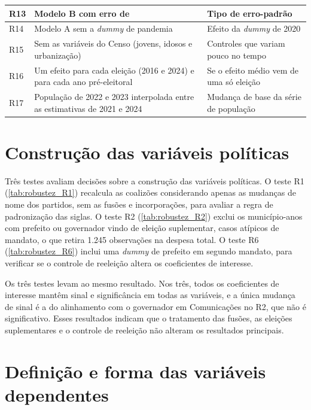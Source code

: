 \begin{quadro}[htbp]
\begin{tabular}{|>{\raggedright\arraybackslash}p{1.0cm}|>{\raggedright\arraybackslash}p{8.0cm}|>{\raggedright\arraybackslash}p{5.0cm}|}
R13 & Modelo B com erro de \textcite{driscoll1998} & Tipo de erro-padrão \\ \hline
R14 & Modelo A sem a \textit{dummy} de pandemia & Efeito da \textit{dummy} de 2020 \\ \hline
R15 & Sem as variáveis do Censo (jovens, idosos e urbanização) & Controles que variam pouco no tempo \\ \hline
R16 & Um efeito para cada eleição (2016 e 2024) e para cada ano pré-eleitoral & Se o efeito médio vem de uma só eleição \\ \hline
R17 & População de 2022 e 2023 interpolada entre as estimativas de 2021 e 2024 & Mudança de base da série de população \\ \hline
\end{tabular}
\end{quadro}

\section{Construção das variáveis políticas}

Três testes avaliam decisões sobre a construção das variáveis políticas. O teste R1 (\autoref{tab:robustez_R1}) recalcula as coalizões considerando apenas as mudanças de nome dos partidos, sem as fusões e incorporações, para avaliar a regra de padronização das siglas. O teste R2 (\autoref{tab:robustez_R2}) exclui os município-anos com prefeito ou governador vindo de eleição suplementar, casos atípicos de mandato, o que retira 1.245 observações na despesa total. O teste R6 (\autoref{tab:robustez_R6}) inclui uma \textit{dummy} de prefeito em segundo mandato, para verificar se o controle de reeleição altera os coeficientes de interesse.

Os três testes levam ao mesmo resultado. Nos três, todos os coeficientes de interesse mantêm sinal e significância em todas as variáveis, e a única mudança de sinal é a do alinhamento com o governador em Comunicações no R2, que não é significativo. Esses resultados indicam que o tratamento das fusões, as eleições suplementares e o controle de reeleição não alteram os resultados principais.


\section{Definição e forma das variáveis dependentes}


